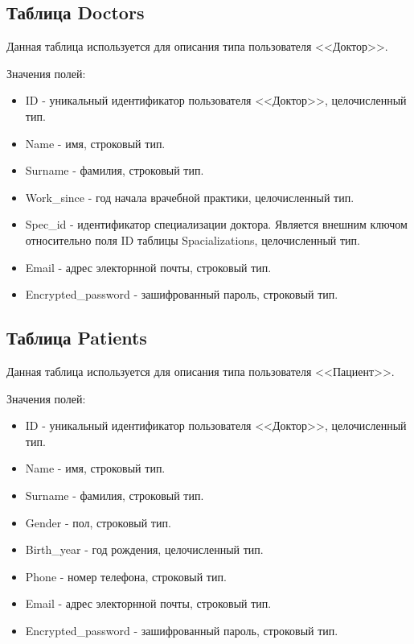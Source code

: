 \subsection*{Таблица Doctors}

Данная таблица используется для описания типа пользователя <<Доктор>>.

Значения полей:

\begin{itemize}
	\item ID - уникальный идентификатор пользователя <<Доктор>>, целочисленный тип.
	\item Name - имя, строковый тип.
	\item Surname - фамилия, строковый тип.
	\item Work\_since - год начала врачебной практики, целочисленный тип.
	\item Spec\_id - идентификатор специализации доктора. Является внешним ключом относительно поля ID таблицы Spacializations, целочисленный тип.
	\item Email - адрес электорнной почты, строковый тип.
	\item Encrypted\_password - зашифрованный пароль, строковый тип.
\end{itemize}

\subsection*{Таблица Patients}

Данная таблица используется для описания типа пользователя <<Пациент>>.

Значения полей:

\begin{itemize}
	\item ID - уникальный идентификатор пользователя <<Доктор>>, целочисленный тип.
	\item Name - имя, строковый тип.
	\item Surname - фамилия, строковый тип.
	\item Gender - пол, строковый тип.
	\item Birth\_year - год рождения, целочисленный тип.
	\item Phone - номер телефона, строковый тип.
	\item Email - адрес электорнной почты, строковый тип.
	\item Encrypted\_password - зашифрованный пароль, строковый тип.
\end{itemize}

